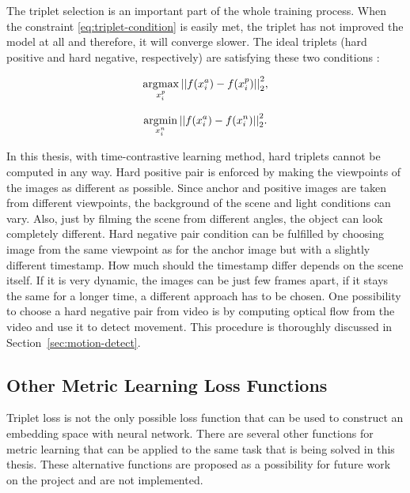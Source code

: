 The triplet selection is an important part of the whole training process. When the constraint \ref{eq:triplet-condition} is easily met, the triplet has not improved the model at all and therefore, it will converge slower. The ideal triplets (hard positive and hard negative, respectively) are satisfying these two conditions \cite{facenet-triplet-loss}:

\begin{equation}
    \label{eq:triplet-sel1}
    \operatorname*{arg\!\max}_{x^{p}_{i}}{{|| f(x^{a}_{i}) - f(x^{p}_{i}) ||}^{2}_{2}},
\end{equation}

\begin{equation}
    \label{eq:triplet-sel2}
    \operatorname*{arg\!\min}_{x^{n}_{i}}{{|| f(x^{a}_{i}) - f(x^{n}_{i}) ||}^{2}_{2}}.
\end{equation}

In this thesis, with time-contrastive learning method, hard triplets cannot be computed in any way. Hard positive pair is enforced by making the viewpoints of the images as different as possible. Since anchor and positive images are taken from different viewpoints, the background of the scene and light conditions can vary. Also, just by filming the scene from different angles, the object can look completely different. Hard negative pair condition can be fulfilled by choosing image from the same viewpoint as for the anchor image but with a slightly different timestamp. How much should the timestamp differ depends on the scene itself. If it is very dynamic, the images can be just few frames apart, if it stays the same for a longer time, a different approach has to be chosen. One possibility to choose a hard negative pair from video is by computing optical flow from the video and use it to detect movement. This procedure is thoroughly discussed in Section~\ref{sec:motion-detect}.

\subsection{\label{sec:other-loss}Other Metric Learning Loss Functions}

Triplet loss is not the only possible loss function that can be used to construct an embedding space with neural network. There are several other functions for metric learning that can be applied to the same task that is being solved in this thesis. These alternative functions are proposed as a possibility for future work on the project and are not implemented.

